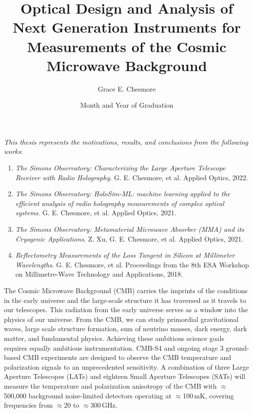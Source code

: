 \documentclass{ucetd}
\title{Optical Design and Analysis of Next Generation Instruments for Measurements of the Cosmic Microwave Background
}
\author{Grace E. Chesmore}
\date{Month and Year of Graduation}  %
\begin{document}
\maketitle

\makecopyright

\tableofcontents
\cleardoublepage
{}
\listoffigures
\cleardoublepage
{}
\listoftables
\newpage

\begin{center}
    \textit{This thesis represents the motivations, results, and conclusions from the following works}:
    \\
    \begin{enumerate}
        \item[\cite{chesmore2022}] \textit{The Simons Observatory: Characterizing the Large Aperture Telescope Receiver with Radio Holography}. G. E. Chesmore, et al. Applied Optics, 2022.
        \item[\cite{Chesmore:21}] \textit{The Simons Observatory: HoloSim-ML: machine learning applied to the efficient analysis of radio holography measurements of complex optical systems}. G. E. Chesmore, et al. Applied Optics, 2021.
        \item[\cite{Xu_2021}] \textit{The Simons Observatory: Metamaterial Microwave Absorber (MMA) and its Cryogenic Applications}. Z. Xu, G. E. Chesmore, et al. Applied Optics, 2021.
        \item[\cite{ches18}] \textit{Reflectometry Measurements of the Loss Tangent in Silicon at Millimeter Wavelengths}. G. E. Chesmore, et al. Proceedings from the 8th ESA Workshop on Millimetre-Wave Technology and Applications, 2018.
    \end{enumerate}

\end{center}
\newpage

\abstract
The Cosmic Microwave Background (CMB) carries the imprints of the conditions in the early universe and the large-scale structure it has traversed as it travels to our telescopes. This radiation from the early universe serves as a window into the physics of our universe. From the CMB, we can study primordial gravitational waves, large scale structure formation, sum of neutrino masses, dark energy, dark matter, and fundamental physics. Achieving these ambitious science goals requires equally ambitious instrumentation.
CMB-S4 and ongoing stage 3 ground-based CMB experiments are designed to observe the CMB temperature and polarization signals to an unprecedented sensitivity. A combination of three Large Aperture Telescopes (LATs) and eighteen Small Aperture Telescopes (SATs) will measure the temperature and polarization anisotropy of the CMB with $\approx$500,000 background noise-limited detectors operating at $\approx$100\,mK, covering frequencies from $\approx$20 to $\approx$300\,GHz.
\end{document}

